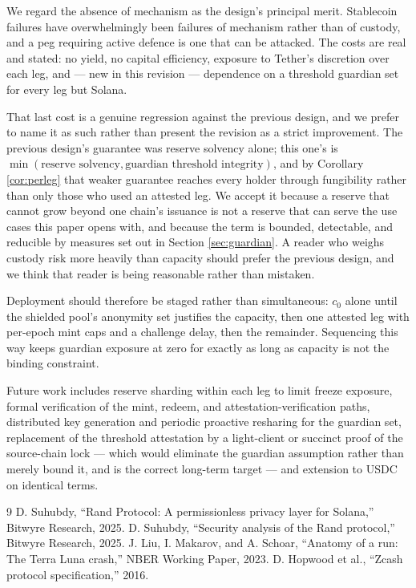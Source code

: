 \documentclass[11pt,a4paper]{article}
\begin{document}
We regard the absence of mechanism as the design's principal merit. Stablecoin failures have overwhelmingly been failures of mechanism rather than of custody, and a peg requiring active defence is one that can be attacked. The costs are real and stated: no yield, no capital efficiency, exposure to Tether's discretion over each leg, and --- new in this revision --- dependence on a threshold guardian set for every leg but Solana.

That last cost is a genuine regression against the previous design, and we prefer to name it as such rather than present the revision as a strict improvement. The previous design's guarantee was reserve solvency alone; this one's is $\min(\text{reserve solvency}, \text{guardian threshold integrity})$, and by Corollary \ref{cor:perleg} that weaker guarantee reaches every holder through fungibility rather than only those who used an attested leg. We accept it because a reserve that cannot grow beyond one chain's issuance is not a reserve that can serve the use cases this paper opens with, and because the term is bounded, detectable, and reducible by measures set out in Section \ref{sec:guardian}. A reader who weighs custody risk more heavily than capacity should prefer the previous design, and we think that reader is being reasonable rather than mistaken.

Deployment should therefore be staged rather than simultaneous: $c_0$ alone until the shielded pool's anonymity set justifies the capacity, then one attested leg with per-epoch mint caps and a challenge delay, then the remainder. Sequencing this way keeps guardian exposure at zero for exactly as long as capacity is not the binding constraint.

Future work includes reserve sharding within each leg to limit freeze exposure, formal verification of the mint, redeem, and attestation-verification paths, distributed key generation and periodic proactive resharing for the guardian set, replacement of the threshold attestation by a light-client or succinct proof of the source-chain lock --- which would eliminate the guardian assumption rather than merely bound it, and is the correct long-term target --- and extension to USDC on identical terms.


\begin{thebibliography}{9}
 D. Suhubdy, ``Rand Protocol: A permissionless privacy layer for Solana,'' Bitwyre Research, 2025.
 D. Suhubdy, ``Security analysis of the Rand protocol,'' Bitwyre Research, 2025.
 J. Liu, I. Makarov, and A. Schoar, ``Anatomy of a run: The Terra Luna crash,'' NBER Working Paper, 2023.
 D. Hopwood et al., ``Zcash protocol specification,'' 2016.
\end{thebibliography}
\end{document}
